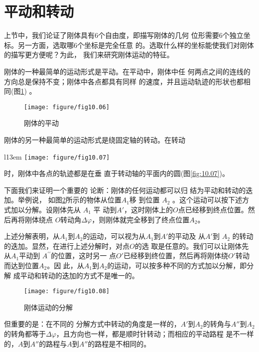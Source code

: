 \documentclass[../outline-of-mechanics.tex]{subfiles}
\begin{document}
\section{平动和转动}\label{sec:10.02}

上节中，我们论证了刚体具有$ 6 $个自由度，即描写刚体的几何
位形需要$ 6 $个独立坐标。另一方面，选取哪$ 6 $个坐标是完全任意
的。选取什么样的坐标能使我们对刚体的描写更方便呢？为此，
我们来研究刚体运动的特征。

刚体的一种最简单的运动形式是平动。在平动中，刚体中任
\clearpage\noindent
何两点之间的连线的方向总是保持不变；刚体中各点都具有同样
的速度，并且运动轨迹的形状也都相同(图\ref{fig:10.06}) 。

\begin{figure}[h]
  \centering
  \texttt{[image: figure/fig10.06]}
  \caption{刚体的平动}
  \label{fig:10.06}
\end{figure}

刚体的另一种最简单的运动形式是绕固定轴的转动。在转动
\begin{wrapfigure}[7]{l}{13em}
  \centering
  \texttt{[image: figure/fig10.07]}
  \caption{刚体绕固定轴的转动}
  \label{fig:10.07}
\end{wrapfigure}
时，刚体中各点的轨迹都是在垂
直于转动轴的平面内的圆(图\ref{fig:10.07})。

下面我们来证明一个重要的
论断：刚体的任何运动都可以归
结为平动和转动的迭加。举例说，
如图\ref{fig:10.08}所示的物体从位置$ A _ { 1 } $移
到位置 $ A _ { 2 } $ 。这个运动可以按下述方式加以分解。设刚体先从 $ A _ { 1 } $ 平
动到$ A' $，这时刚体上的$ O $点已经移到终点位置。然后再将刚体绕点
$ O $转动角$ \Delta \varphi $，则刚体就完全移到了终点位置$ A_2 $。

上述分解表明，从$ A_1 $到$ A_2 $的运动，可以视为从$ A_1 $到$ A' $的平动及
从$ A' $到 $ A _ { 2 } $ 的转动的迭加。显然，在进行上述分解时，对点$ O $的选
取是任意的。我们可以让刚体先从$ A_1 $平动到 $ A ^ {\prime \prime } $的位置，这时另一
点$ O' $已经移到终位置，然后再将刚体绕$ O' $转动而达到位置$ A _ { 2 } $。因
此，从$ A _ { 1 } $到$ A_2 $的运动，可以按多种不同的方式加以分解，即分解%
成平动和转动的迭加的方式不是唯一的。
\begin{figure}[h]
  \centering
  \texttt{[image: figure/fig10.08]}
  \caption{刚体运动的分解}
  \label{fig:10.08}
\end{figure}%
但重要的是：在不同的
分解方式中转动的角度是一样的，$ A' $到$ A_2 $的转角与$ A'' $到$ A_2 $的转角都等于$ \Delta \varphi $，且方向也一样，都是顺时针转动；而相应的平动路程
是不一样的，$ A $到$ A'' $的路程与$ A $到$ A'' $的路程是不相同的。
\end{document}
